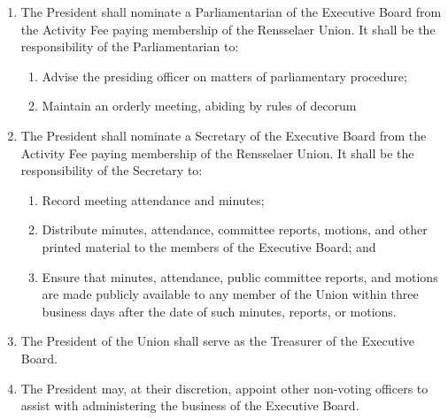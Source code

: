 \documentclass{uniondoc}
\begin{document}
\begin{enumerate}
\begin{enumerate}
\begin{enumerate}
    \item Should a decision power not be explicitly listed in the regulation, it shall not be overridable.
    \end{enumerate}
  \item For overrideable decisions made outside of a regular Board meeting, the President must inform the Vice Presidents of their intended decision, and the Vice Presidents have 16 hours to overrule their decision.
    \begin{enumerate}
    \item Should no decision be made within those 16 hours, the President may inform the relevant party of their decision.
    \item The Vice Presidents may waive their ability to overrule, in which case the President may inform the relevant parties.
    \end{enumerate}
  \end{enumerate}
\item The President shall nominate a Parliamentarian of the Executive Board from the Activity Fee paying membership of the Rensselaer Union. It shall be the responsibility of the Parliamentarian to:
  \begin{enumerate}
  \item Advise the presiding officer on matters of parliamentary procedure;
  \item Maintain an orderly meeting, abiding by rules of decorum
  \end{enumerate}
\item The President shall nominate a Secretary of the Executive Board from the Activity Fee paying membership of the Rensselaer Union. It shall be the responsibility of the Secretary to:
  \begin{enumerate}
  \item Record meeting attendance and minutes;
  \item Distribute minutes, attendance, committee reports, motions, and other printed material to the members of the Executive Board; and
  \item Ensure that minutes, attendance, public committee reports, and motions are made publicly available to any member of the Union within three business days after the date of such minutes, reports, or motions.
  \end{enumerate}
\item The President of the Union shall serve as the Treasurer of the Executive Board.
\item The President may, at their discretion, appoint other non-voting officers to assist with administering the business of the Executive Board.

\end{enumerate}
\end{document}
